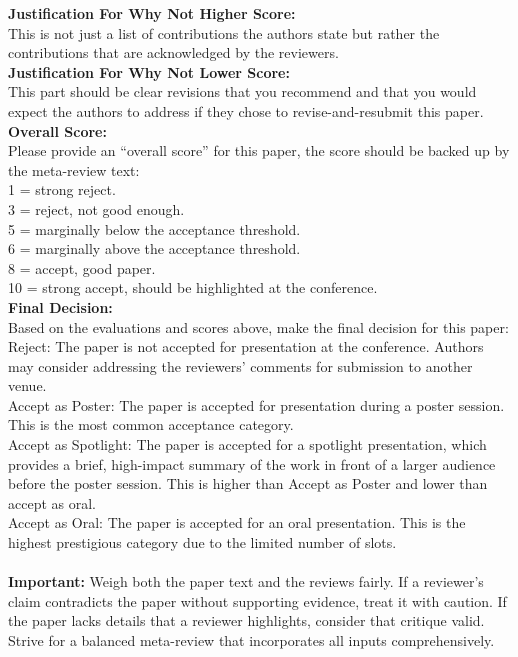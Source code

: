 \begin{figure*}[h]
\begin{prompt}[title={Prompt \thetcbcounter: LLM-as-Meta-Reviewer: Template COT}]
\textbf{Justification For Why Not Higher Score:}\\
This is not just a list of contributions the authors state but rather the contributions that are acknowledged by the reviewers.\\

\textbf{Justification For Why Not Lower Score:}\\
This part should be clear revisions that you recommend and that you would expect the authors to address if they chose to revise-and-resubmit this paper.\\

\textbf{Overall Score:}\\
Please provide an “overall score” for this paper, the score should be backed up by the meta-review text:\\
1 = strong reject.\\
3 = reject, not good enough.\\
5 = marginally below the acceptance threshold.\\
6 = marginally above the acceptance threshold.\\
8 = accept, good paper.\\
10 = strong accept, should be highlighted at the conference.\\

\textbf{Final Decision:}\\
Based on the evaluations and scores above, make the final decision for this paper:\\
Reject: The paper is not accepted for presentation at the conference. Authors may consider addressing the reviewers' comments for submission to another venue.\\
Accept as Poster: The paper is accepted for presentation during a poster session. This is the most common acceptance category.\\
Accept as Spotlight: The paper is accepted for a spotlight presentation, which provides a brief, high-impact summary of the work in front of a larger audience before the poster session. This is higher than Accept as Poster and lower than accept as oral.\\
Accept as Oral: The paper is accepted for an oral presentation. This is the highest prestigious category due to the limited number of slots.\\ \\

\textbf{Important:} Weigh both the paper text and the reviews fairly. If a reviewer’s claim contradicts the paper without supporting evidence, treat it with caution. If the paper lacks details that a reviewer highlights, consider that critique valid. Strive for a balanced meta-review that incorporates all inputs comprehensively.\\ \\



\end{prompt}
\end{figure*}
